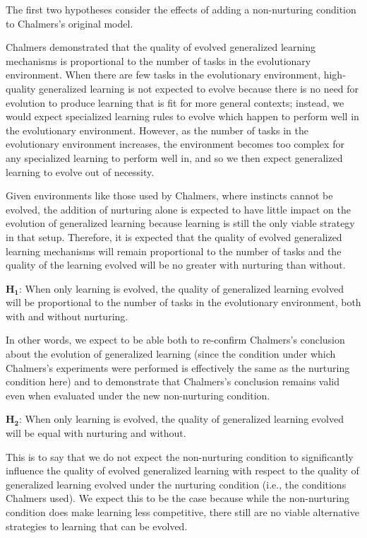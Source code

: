 \documentclass[master]{outhesis}
\begin{document}
The first two hypotheses consider the effects of adding a non-nurturing condition to Chalmers's original model.

Chalmers demonstrated that the quality of evolved generalized learning mechanisms is proportional to the number of tasks in the evolutionary environment. When there are few tasks in the evolutionary environment, high-quality generalized learning is not expected to evolve
because there is no need for evolution to produce learning that is fit for more general contexts;
instead, we would expect specialized learning rules to evolve which happen to perform well in the evolutionary environment.
However, as the number of tasks in the evolutionary environment increases,
the environment becomes too complex for any specialized learning to perform well in,
and so we then expect generalized learning to evolve out of necessity.

Given environments like those used by Chalmers, where instincts cannot be evolved, the addition of nurturing alone is expected to have little impact on the evolution of generalized learning because learning is still the only viable strategy in that setup. Therefore, it is expected that the quality of evolved generalized learning mechanisms will remain proportional to the number of tasks and the quality of the learning evolved will be no greater with nurturing than without.

$\mathbf{H_1}$: When only learning is evolved, the quality of generalized learning evolved will be proportional to the number of tasks in the evolutionary environment, both with and without nurturing.

In other words, we expect to be able both 
to re-confirm Chalmers's conclusion about the evolution of generalized learning
(since the condition under which Chalmers's experiments were performed is effectively the same as the nurturing condition here) 
and to demonstrate that Chalmers's conclusion remains valid even when evaluated under the new non-nurturing condition.

$\mathbf{H_2}$: When only learning is evolved, the quality of generalized learning evolved will be equal with nurturing and without.

This is to say that we do not expect the non-nurturing condition to significantly influence the quality of evolved generalized learning
with respect to the quality of generalized learning evolved under the nurturing condition (i.e., the conditions Chalmers used).
We expect this to be the case because while the non-nurturing condition does make learning less competitive,
there still are no viable alternative strategies to learning that can be evolved.
\end{document}
